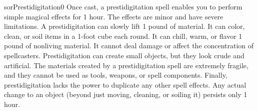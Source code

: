 \begin{spellcard}{sor}{Prestidigitation}{0}
  Once cast, a prestidigitation spell enables you to perform simple magical effects for 1 hour.
  The effects are minor and have severe limitations.
  A prestidigitation can slowly lift 1 pound of material.
  It can color, clean, or soil items in a 1-foot cube each round.
  It can chill, warm, or flavor 1 pound of nonliving material.
  It cannot deal damage or affect the concentration of spellcasters.
  Prestidigitation can create small objects, but they look crude and artificial.
  The materials created by a prestidigitation spell are extremely fragile,
  and they cannot be used as tools, weapons, or spell components.
  Finally, prestidigitation lacks the power to duplicate any other spell effects.
  Any actual change to an object (beyond just moving, cleaning, or soiling it) persists only 1 hour.
\end{spellcard}
